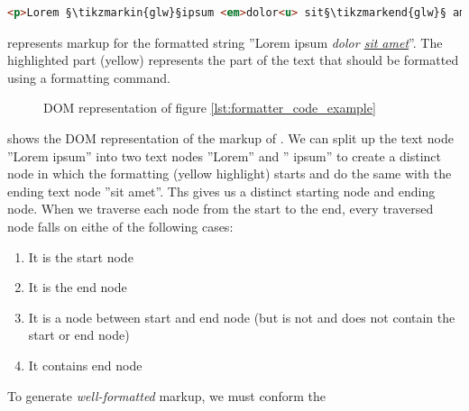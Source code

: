 \begin{lstlisting}[language=html, caption=Markup with highlighted target for formatting, label=lst:formatter_code_example]
<p>Lorem §\tikzmarkin{glw}§ipsum <em>dolor<u> sit§\tikzmarkend{glw}§ amet</u></em></p>
\end{lstlisting}

 represents markup for the formatted string ''Lorem ipsum \textit{dolor \underline{sit amet}}''. The highlighted part (yellow) represents the part of the text that should be formatted using a formatting command.

\begin{figure}[!htb]
\centering
{}
\caption{DOM representation of figure \ref{lst:formatter_code_example}}
\label{fig:formatting_dom_tree}
\end{figure}

 shows the DOM representation of the markup of . We can split up the text node ''Lorem ipsum'' into two text nodes ''Lorem'' and '' ipsum'' to create a distinct node in which the formatting (yellow highlight) starts and do the same with the ending text node ''sit amet''. Ths gives us a distinct starting node and ending node. When we traverse each node from the start to the end, every traversed node falls on eithe of the following cases:

\begin{enumerate}
\item It is the start node
\item It is the end node
\item It is a node between start and end node (but is not and does not contain the start or end node)
\item It contains end node
\end{enumerate}

\noindent To generate \textit{well-formatted} markup, we must conform the 

